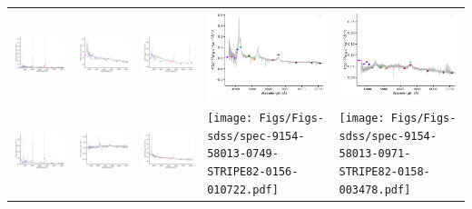 \begin{center}
\begin{longtable}{l l l l l }
    \includegraphics[width=0.19\linewidth, clip]{Figs/Figs-sdss/spec-9144-57666-0109-STRIPE82-0127-008619.pdf} & \includegraphics[width=0.19\linewidth, clip]{Figs/Figs-sdss/spec-9145-58041-0210-SPLUS-s02s05-026507.pdf} & \includegraphics[width=0.19\linewidth, clip]{Figs/Figs-sdss/spec-9146-58042-0345-SPLUS-s02s07-034127.pdf} & \includegraphics[width=0.19\linewidth, clip]{Figs/Figs-sdss/spec-9146-58042-0510-STRIPE82-0131-050516.pdf} & \includegraphics[width=0.19\linewidth, clip]{Figs/Figs-sdss/spec-9147-58038-0401-SPLUS-s02s08-004413.pdf} \\
    \includegraphics[width=0.19\linewidth, clip]{Figs/Figs-sdss/spec-9150-58043-0660-STRIPE82-0143-028004.pdf} & \includegraphics[width=0.19\linewidth, clip]{Figs/Figs-sdss/spec-9151-58067-0073-STRIPE82-0147-026690.pdf} & \includegraphics[width=0.19\linewidth, clip]{Figs/Figs-sdss/spec-9152-58041-0463-STRIPE82-0147-005730.pdf} & \texttt{[image: Figs/Figs-sdss/spec-9154-58013-0749-STRIPE82-0156-010722.pdf]} & \texttt{[image: Figs/Figs-sdss/spec-9154-58013-0971-STRIPE82-0158-003478.pdf]} \\

\end{longtable}
\end{center}
